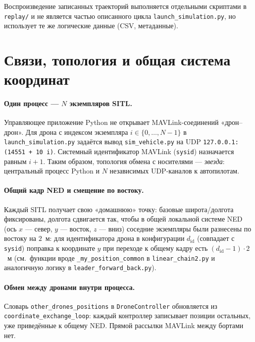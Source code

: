 \documentclass[12pt,a4paper]{article}
\begin{document}
Воспроизведение записанных траекторий выполняется отдельными скриптами в \texttt{replay/} и не является частью описанного цикла \texttt{launch\_simulation.py}, но использует те же логические данные (CSV, метаданные).

\section{Связи, топология и общая система координат}
\label{sec:topology}

\paragraph{Один процесс --- $N$ экземпляров SITL.}
Управляющее приложение Python не открывает MAVLink-соединений «дрон--дрон». Для дрона с индексом экземпляра $i \in \{0,\ldots,N-1\}$ в \texttt{launch\_simulation.py} задаётся вывод \texttt{sim\_vehicle.py} на UDP \texttt{127.0.0.1:(14551 + 10 i)}. Системный идентификатор MAVLink (\texttt{sysid}) назначается равным $i+1$. Таким образом, топология обмена с носителями --- \emph{звезда}: центральный процесс Python и $N$ независимых UDP-каналов к автопилотам.

\paragraph{Общий кадр NED и смещение по востоку.}
Каждый SITL получает свою «домашнюю» точку: базовые широта/долгота фиксированы, долгота сдвигается так, чтобы в общей локальной системе NED (ось $x$ --- север, $y$ --- восток, $z$ --- вниз) соседние экземпляры были разнесены по востоку на $2$~м: для идентификатора дрона в конфигурации $d_{\mathrm{id}}$ (совпадает с \texttt{sysid}) поправка к координате $y$ при переходе к общему кадру есть $(d_{\mathrm{id}}-1)\cdot 2$~м (см.\ функции вроде \texttt{\_my\_position\_common} в \texttt{linear\_chain2.py} и аналогичную логику в \texttt{leader\_forward\_back.py}).

\paragraph{Обмен между дронами внутри процесса.}
Словарь \texttt{other\_drones\_positions} в \texttt{DroneController} обновляется из \texttt{coordinate\_exchange\_loop}: каждый контроллер записывает позиции остальных, уже приведённые к общему NED. Прямой рассылки MAVLink между бортами нет.
\end{document}
